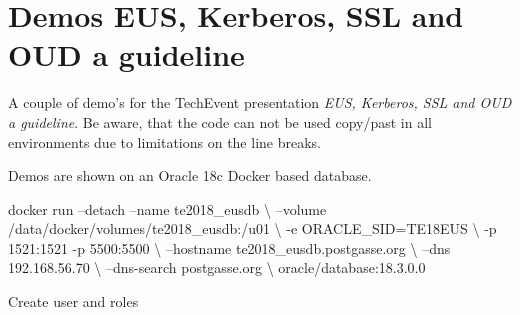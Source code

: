 \documentclass[a4paper,,tablecaptionabove]{scrartcl}
\newenvironment{Shaded}{}{}
\newcommand{\ExtensionTok}[1]{#1}
\newcommand{\FunctionTok}[1]{\textcolor[rgb]{0.02,0.16,0.49}{#1}}
\newcommand{\KeywordTok}[1]{\textcolor[rgb]{0.00,0.44,0.13}{\textbf{#1}}}
\newcommand{\NormalTok}[1]{#1}
\newcommand{\StringTok}[1]{\textcolor[rgb]{0.25,0.44,0.63}{#1}}
\begin{document}
    

  
      {
            \setcounter{tocdepth}{3}
      \tableofcontents
              \newpage
          }
  
  \listoftables

  \listoffigures

\hypertarget{demos-eus-kerberos-ssl-and-oud-a-guideline}{%
\section{Demos EUS, Kerberos, SSL and OUD a
guideline}\label{demos-eus-kerberos-ssl-and-oud-a-guideline}}

A couple of demo's for the TechEvent presentation \emph{EUS, Kerberos,
SSL and OUD a guideline}. Be aware, that the code can not be used
copy/past in all environments due to limitations on the line breaks.

Demos are shown on an Oracle 18c Docker based database.

\begin{Shaded}
\begin{Highlighting}[]
\ExtensionTok{docker}\NormalTok{ run --detach --name te2018_eusdb \textbackslash{}}
\NormalTok{  --volume /data/docker/volumes/te2018_eusdb:/u01 \textbackslash{}}
\NormalTok{  -e ORACLE_SID=TE18EUS \textbackslash{}}
\NormalTok{  -p 1521:1521 -p 5500:5500 \textbackslash{}}
\NormalTok{  --hostname te2018_eusdb.postgasse.org \textbackslash{}}
\NormalTok{  --dns 192.168.56.70 \textbackslash{}}
\NormalTok{  --dns-search postgasse.org \textbackslash{}}
\NormalTok{  oracle/database:18.3.0.0}
\end{Highlighting}
\end{Shaded}

Create user and roles

\begin{Shaded}
\end{Shaded}
\end{document}
